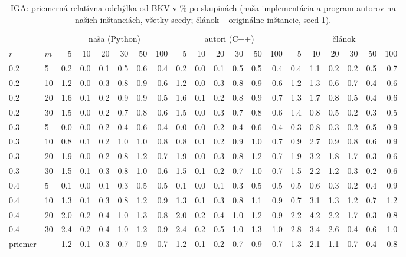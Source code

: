\begin{table}[ht]
\centering
\scriptsize
\setlength{\tabcolsep}{3pt}
\caption{IGA: priemerná relatívna odchýlka od BKV v \% po skupinách (naša implementácia a program autorov na našich inštanciách, všetky seedy; článok – originálne inštancie, seed 1).}
\label{tab:rpd_iga}
\begin{tabular}{ll|rrrrrr|rrrrrr|rrrrrr}
\toprule
 &  & \multicolumn{6}{c}{naša (Python)} & \multicolumn{6}{c}{autori (C++)} & \multicolumn{6}{c}{článok} \\
$r$ & $m$ & 5 & 10 & 20 & 30 & 50 & 100 & 5 & 10 & 20 & 30 & 50 & 100 & 5 & 10 & 20 & 30 & 50 & 100 \\
\midrule
0.2 & 5 & 0.2 & 0.0 & 0.1 & 0.5 & 0.6 & 0.4 & 0.2 & 0.0 & 0.1 & 0.5 & 0.5 & 0.4 & 0.4 & 1.1 & 0.2 & 0.2 & 0.5 & 0.7 \\
0.2 & 10 & 1.2 & 0.0 & 0.3 & 0.8 & 0.9 & 0.6 & 1.2 & 0.0 & 0.3 & 0.8 & 0.9 & 0.6 & 1.2 & 1.3 & 0.6 & 0.7 & 0.4 & 0.6 \\
0.2 & 20 & 1.6 & 0.1 & 0.2 & 0.9 & 0.9 & 0.5 & 1.6 & 0.1 & 0.2 & 0.8 & 0.9 & 0.7 & 1.3 & 1.7 & 0.8 & 0.5 & 0.4 & 0.6 \\
0.2 & 30 & 1.5 & 0.0 & 0.2 & 0.7 & 0.8 & 0.6 & 1.5 & 0.0 & 0.3 & 0.7 & 0.8 & 0.6 & 1.4 & 0.8 & 0.5 & 0.2 & 0.3 & 0.5 \\
0.3 & 5 & 0.0 & 0.0 & 0.2 & 0.4 & 0.6 & 0.4 & 0.0 & 0.0 & 0.2 & 0.4 & 0.6 & 0.4 & 0.3 & 0.8 & 0.3 & 0.2 & 0.5 & 0.9 \\
0.3 & 10 & 0.8 & 0.1 & 0.2 & 1.0 & 1.0 & 0.8 & 0.8 & 0.1 & 0.2 & 0.9 & 1.0 & 0.7 & 0.9 & 2.7 & 0.9 & 0.8 & 0.6 & 0.9 \\
0.3 & 20 & 1.9 & 0.0 & 0.2 & 0.8 & 1.2 & 0.7 & 1.9 & 0.0 & 0.3 & 0.8 & 1.2 & 0.7 & 1.9 & 3.2 & 1.8 & 1.7 & 0.3 & 0.6 \\
0.3 & 30 & 1.5 & 0.1 & 0.3 & 0.8 & 1.0 & 0.6 & 1.5 & 0.1 & 0.2 & 0.7 & 1.0 & 0.7 & 1.5 & 2.2 & 1.2 & 0.3 & 0.2 & 0.6 \\
0.4 & 5 & 0.1 & 0.0 & 0.1 & 0.3 & 0.5 & 0.5 & 0.1 & 0.0 & 0.1 & 0.3 & 0.5 & 0.5 & 0.5 & 0.6 & 0.3 & 0.2 & 0.4 & 0.9 \\
0.4 & 10 & 1.3 & 0.1 & 0.3 & 0.8 & 1.2 & 0.9 & 1.3 & 0.1 & 0.3 & 0.8 & 1.1 & 0.9 & 0.7 & 3.1 & 1.3 & 1.2 & 0.7 & 1.2 \\
0.4 & 20 & 2.0 & 0.2 & 0.4 & 1.0 & 1.3 & 0.8 & 2.0 & 0.2 & 0.4 & 1.0 & 1.2 & 0.9 & 2.2 & 4.2 & 2.2 & 1.7 & 0.3 & 0.8 \\
0.4 & 30 & 2.4 & 0.2 & 0.4 & 1.0 & 1.2 & 0.9 & 2.4 & 0.2 & 0.5 & 1.0 & 1.3 & 1.0 & 2.8 & 3.4 & 2.6 & 0.4 & 0.6 & 1.0 \\
\midrule
priemer &  & 1.2 & 0.1 & 0.3 & 0.7 & 0.9 & 0.7 & 1.2 & 0.1 & 0.2 & 0.7 & 0.9 & 0.7 & 1.3 & 2.1 & 1.1 & 0.7 & 0.4 & 0.8 \\
\bottomrule
\end{tabular}
\end{table}
